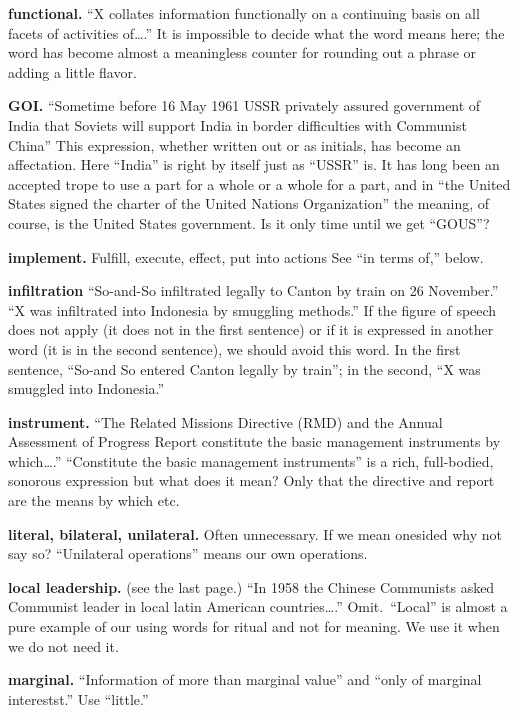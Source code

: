 \documentclass[
    oneside,
    11pt,
]{memoir}
\begin{document}
\textbf{functional.} \enquote{X collates information functionally on a continuing basis on all facets of activities of\dots.} It is impossible to decide what the word means here; the word has become almost a meaningless counter for rounding out a phrase or adding a little flavor.

\textbf{GOI.} \enquote{Sometime before 16 May 1961 USSR privately assured government of India that Soviets will support India in border difficulties with Communist China} This expression, whether written out or as initials, has become an affectation. Here \enquote{India} is right by itself just as \enquote{USSR} is. It has long been an accepted trope to use a part for a whole or a whole for a part, and in \enquote{the United States signed the charter of the United Nations Organization} the meaning, of course, is the United States government. Is it only time until we get \enquote{GOUS}?

\textbf{implement.} Fulfill, execute, effect, put into actions See \enquote{in terms of,} below.

\textbf{infiltration} \enquote{So-and-So infiltrated legally to Canton by train on 26 November.} \enquote{X was infiltrated into Indonesia by smuggling methods.} If the figure of speech does not apply (it does not in the first sentence) or if it is expressed in another word (it is in the second sentence), we should avoid this word. In the first sentence, \enquote{So-and So entered Canton legally by train}; in the second, \enquote{X was smuggled into Indonesia.}

\textbf{instrument.} \enquote{The Related Missions Directive (RMD) and the Annual Assessment of Progress Report constitute the basic management instruments by which\dots.} \enquote{Constitute the basic management instruments} is a rich, full-bodied, sonorous expression but what does it mean? Only that the directive and report are the means by which etc.

\textbf{literal, bilateral, unilateral.} Often unnecessary. If we mean onesided why not say so? \enquote{Unilateral operations} means our own operations.

\textbf{local leadership.} (see the last page.) \enquote{In 1958 the Chinese Communists asked Communist leader in local latin American countries\dots.} Omit.\ \enquote{Local} is almost a pure example of our using words for ritual and not for meaning. We use it when we do not need it.

\textbf{marginal.} \enquote{Information of more than marginal value} and \enquote{only of marginal interestst.} Use \enquote{little.}
\end{document}
